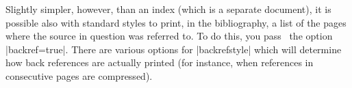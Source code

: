 Slightly simpler, however, than an index (which is a separate
document), it is possible also with standard styles to print, in the
bibliography, a list of the pages where the source in question was
referred to. To do this, you pass \biblatex\ the option
|backref=true|. There are various options for
|backrefstyle| which will determine how back references are actually
printed (for instance, when references in consecutive pages are
compressed).


